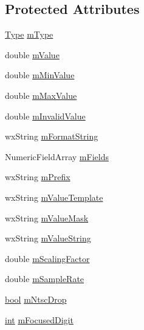 \subsection*{Protected Attributes}
\begin{DoxyCompactItemize}
\item 
\hyperlink{class_numeric_converter_a2005a4bd0c2a9614868772e37fb9e2fb}{Type} \hyperlink{class_numeric_converter_aff1bfcbfd6002c1176f57d907c49ae4b}{m\+Type}
\item 
double \hyperlink{class_numeric_converter_a76d02fd3753f469f97d696011a7006eb}{m\+Value}
\item 
double \hyperlink{class_numeric_converter_a3b20fff34e6f70b700c5a197727fd8e0}{m\+Min\+Value}
\item 
double \hyperlink{class_numeric_converter_af73b8b790f15f3fbaf5896c3e6b9a96e}{m\+Max\+Value}
\item 
double \hyperlink{class_numeric_converter_a855aebd9efec09dbe697510424d28094}{m\+Invalid\+Value}
\item 
wx\+String \hyperlink{class_numeric_converter_af5ecbc8fd021996712aabe81c1f27db7}{m\+Format\+String}
\item 
Numeric\+Field\+Array \hyperlink{class_numeric_converter_a237e724ac437e538aec83825aa35853f}{m\+Fields}
\item 
wx\+String \hyperlink{class_numeric_converter_ab5741e9903751c8a8ed6f06ede72f659}{m\+Prefix}
\item 
wx\+String \hyperlink{class_numeric_converter_a64ceed9482d254e37fbe217496747dce}{m\+Value\+Template}
\item 
wx\+String \hyperlink{class_numeric_converter_a4a1e3563294fc2813e56c5a4b3403ee7}{m\+Value\+Mask}
\item 
wx\+String \hyperlink{class_numeric_converter_ac8edd92e89a3f4055b4d85bfc1901dd4}{m\+Value\+String}
\item 
double \hyperlink{class_numeric_converter_aa7fb7f340cd65b16eabc8c998900d34f}{m\+Scaling\+Factor}
\item 
double \hyperlink{class_numeric_converter_ab2d5c31502bda8b467b9fdc3771ebb4a}{m\+Sample\+Rate}
\item 
\hyperlink{mac_2config_2i386_2lib-src_2libsoxr_2soxr-config_8h_abb452686968e48b67397da5f97445f5b}{bool} \hyperlink{class_numeric_converter_ad16003781c66415fc9da547bf6b292fa}{m\+Ntsc\+Drop}
\item 
\hyperlink{xmltok_8h_a5a0d4a5641ce434f1d23533f2b2e6653}{int} \hyperlink{class_numeric_converter_a1780654f7174b869496bbff9c6b310b0}{m\+Focused\+Digit}

\end{DoxyCompactItemize}

